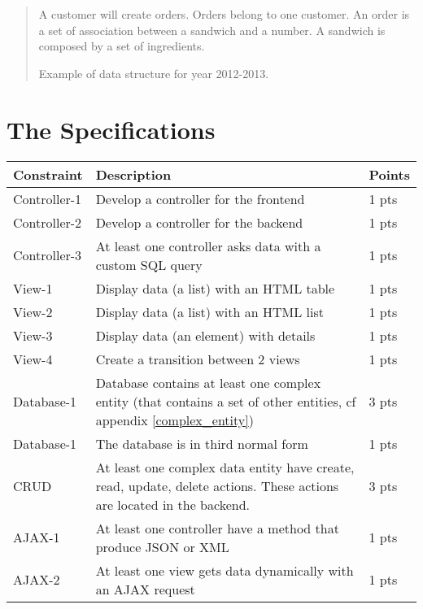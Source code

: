 \documentclass{article}         %
\newcounter{notetab}
\newcommand{\zero}{\setcounter{notetab}{0}}
\newcommand{\ntm}{\footnotemark\addtocounter{notetab}{1}}
\begin{document}
\begin{quotation}
A customer will create orders. Orders belong to one customer. An order is a set of association between a sandwich and a number. A sandwich is composed by a set of ingredients. \par
\raggedleft Example of data structure for year 2012-2013.
\end{quotation}



\section{The Specifications}
\label{specs}

\zero
\begin{tabular}{|p{2cm}|p{10cm}|p{1cm}|}
  \hline
  Constraint & Description & Points \\

  \hline
  Controller-1 & Develop a controller for the frontend & 1 pts \\
  Controller-2 & Develop a controller for the backend & 1 pts \\
  Controller-3 & At least one controller asks data with a custom SQL query & 1 pts \\

  \hline
  View-1 & Display data (a list) with an HTML table & 1 pts \\
  View-2 & Display data (a list) with an HTML list & 1 pts \\
  View-3 & Display data (an element) with details & 1 pts \\
  View-4 & Create a transition between 2 views & 1 pts \\

  \hline
  Database-1 & Database contains at least one complex entity (that contains a set of other entities, cf appendix \ref{complex_entity}) & 3 pts \\
  Database-1 & The database is in third normal form \ntm & 1 pts \\

  \hline
  CRUD & At least one complex data entity have create, read, update, delete actions. These actions are located in the backend. & 3 pts \\

  \hline
  AJAX-1 & At least one controller have a method that produce JSON or XML & 1 pts \\
  AJAX-2 & At least one view gets data dynamically with an AJAX request & 1 pts \\


\end{tabular}
\end{document}
